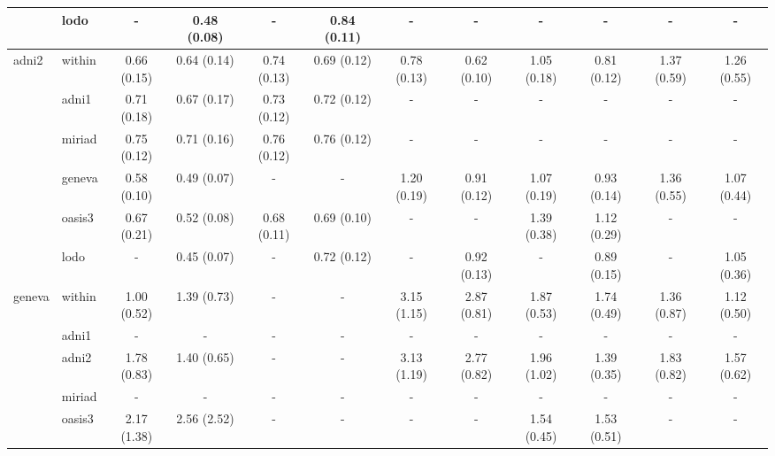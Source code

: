 \begin{table*}
{\begin{tabular}{llcccccccccc}
\cmidrule(lr){2-12}
       & lodo &            - &  0.48 (0.08) &            - &  0.84 (0.11) &            - &            - &            - &            - &            - &            - \\
\midrule
adni2 & within &  0.66 (0.15) &  0.64 (0.14) &  0.74 (0.13) &  0.69 (0.12) &  0.78 (0.13) &  0.62 (0.10) &  1.05 (0.18) &  0.81 (0.12) &  1.37 (0.59) &  1.26 (0.55) \\
\cmidrule(lr){2-12}
       & adni1 &  0.71 (0.18) &  0.67 (0.17) &  0.73 (0.12) &  0.72 (0.12) &            - &            - &            - &            - &            - &            - \\
       & miriad &  0.75 (0.12) &  0.71 (0.16) &  0.76 (0.12) &  0.76 (0.12) &            - &            - &            - &            - &            - &            - \\
       & geneva &  0.58 (0.10) &  0.49 (0.07) &            - &            - &  1.20 (0.19) &  0.91 (0.12) &  1.07 (0.19) &  0.93 (0.14) &  1.36 (0.55) &  1.07 (0.44) \\
       & oasis3 &  0.67 (0.21) &  0.52 (0.08) &  0.68 (0.11) &  0.69 (0.10) &            - &            - &  1.39 (0.38) &  1.12 (0.29) &            - &            - \\
\cmidrule(lr){2-12}
       & lodo &            - &  0.45 (0.07) &            - &  0.72 (0.12) &            - &  0.92 (0.13) &            - &  0.89 (0.15) &            - &  1.05 (0.36) \\
\midrule
geneva & within &  1.00 (0.52) &  1.39 (0.73) &            - &            - &  3.15 (1.15) &  2.87 (0.81) &  1.87 (0.53) &  1.74 (0.49) &  1.36 (0.87) &  1.12 (0.50) \\
\cmidrule(lr){2-12}
       & adni1 &            - &            - &            - &            - &            - &            - &            - &            - &            - &            - \\
       & adni2 &  1.78 (0.83) &  1.40 (0.65) &            - &            - &  3.13 (1.19) &  2.77 (0.82) &  1.96 (1.02) &  1.39 (0.35) &  1.83 (0.82) &  1.57 (0.62) \\
       & miriad &            - &            - &            - &            - &            - &            - &            - &            - &            - &            - \\
       & oasis3 &  2.17 (1.38) &  2.56 (2.52) &            - &            - &            - &            - &  1.54 (0.45) &  1.53 (0.51) &            - &            - \\
\cmidrule(lr){2-12}

\end{tabular}}
\end{table*}
